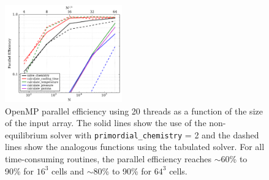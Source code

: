 \begin{figure}
  \centering
  \includegraphics[width=0.45\textwidth]{fig__openmp_performance.pdf}
  \caption{
    OpenMP parallel efficiency using 20 threads as a function of the size of
    the input array. The solid lines show the use of the
    non-equilibrium solver with \texttt{primordial\_chemistry} = 2 and
    the dashed lines show the analogous functions using the tabulated
    solver.  For all time-consuming
    routines, the parallel efficiency reaches $\sim$60\% to 90\% for
    $16^3$ cells and $\sim$80\% to 90\% for $64^3$ cells.
  } \label{fig:omp-perf}
\end{figure}

